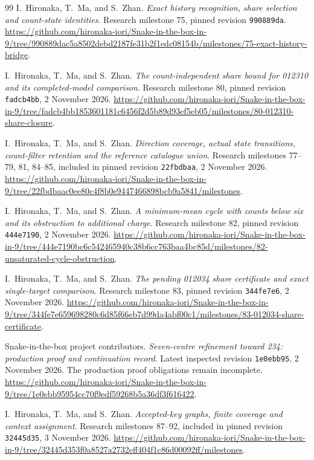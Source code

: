 \documentclass[11pt,a4paper]{article}
\theoremstyle{definition}
\theoremstyle{remark}
\begin{document}
\begin{thebibliography}{99}
I.~Hironaka, T.~Ma, and S.~Zhan. \emph{Exact history recognition, share selection and count-state identities}. Research milestone 75, pinned revision \texttt{990889da}.
\url{https://github.com/hironaka-iori/Snake-in-the-box-in-9/tree/990889dac5a8502debd2187fe31b2f1edc08154b/milestones/75-exact-history-bridge}.

I.~Hironaka, T.~Ma, and S.~Zhan. \emph{The count-independent share bound for 012310 and its completed-model comparison}. Research milestone 80, pinned revision \texttt{fadcb4bb}, 2 November 2026.
\url{https://github.com/hironaka-iori/Snake-in-the-box-in-9/tree/fadcb4bb1853601181c6456f2d5b89d93ef5eb05/milestones/80-012310-share-closure}.

I.~Hironaka, T.~Ma, and S.~Zhan. \emph{Direction coverage, actual state transitions, count-filter retention and the reference catalogue union}. Research milestones 77--79, 81, 84--85, included in pinned revision \texttt{22fbdbaa}, 2 November 2026.
\url{https://github.com/hironaka-iori/Snake-in-the-box-in-9/tree/22fbdbaac0ee80c4f8b0e9447466898bcb9a5841/milestones}.

I.~Hironaka, T.~Ma, and S.~Zhan. \emph{A minimum-mean cycle with counts below six and its obstruction to additional charge}. Research milestone 82, pinned revision \texttt{444e7190}, 2 November 2026.
\url{https://github.com/hironaka-iori/Snake-in-the-box-in-9/tree/444e7190bc6c542465940c38b6cc763baa4bc85d/milestones/82-unsaturated-cycle-obstruction}.

I.~Hironaka, T.~Ma, and S.~Zhan. \emph{The pending 012034 share certificate and exact single-target comparison}. Research milestone 83, pinned revision \texttt{344fe7e6}, 2 November 2026.
\url{https://github.com/hironaka-iori/Snake-in-the-box-in-9/tree/344fe7e659698280c6d85f66eb7d99da4abf00c1/milestones/83-012034-share-certificate}.

Snake-in-the-box project contributors. \emph{Seven-centre refinement toward 234: production proof and continuation record}. Latest inspected revision \texttt{1e0ebb95}, 2 November 2026. The production proof obligations remain incomplete.
\url{https://github.com/hironaka-iori/Snake-in-the-box-in-9/tree/1e0ebb95954cc70f9edf59268b5a36df3f616422}.

I.~Hironaka, T.~Ma, and S.~Zhan. \emph{Accepted-key graphs, finite coverage and context assignment}. Research milestones 87--92, included in pinned revision \texttt{32445d35}, 3 November 2026.
\url{https://github.com/hironaka-iori/Snake-in-the-box-in-9/tree/32445d353f0a8527a2732eff404f1c86d00092ff/milestones}.


\end{thebibliography}
\end{document}
